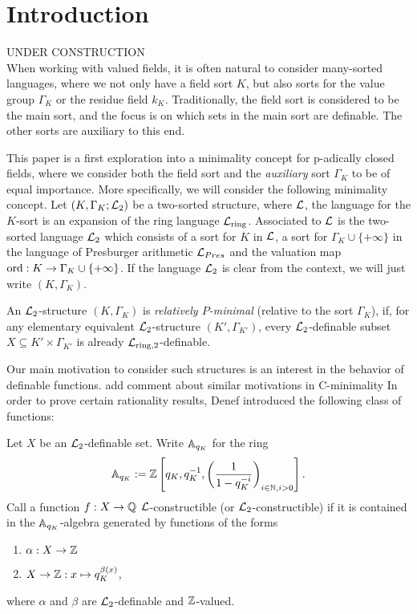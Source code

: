 \section{Introduction}
UNDER CONSTRUCTION\\
When working with valued fields, it is often natural to consider many-sorted languages, where we not only have a field sort $K$, but also sorts for the value group $\Gamma_K$ or the residue field $k_K$. Traditionally, the field sort is considered to be the main sort, and the focus is on which sets in the main sort are definable. The other sorts are auxiliary to this end.

This paper is a first exploration into a minimality concept for p-adically closed fields, where we consider both the field sort and the \emph{auxiliary} sort $\Gamma_K$ to be of equal importance. More specifically, we will consider the following minimality concept. Let $(K, \Gamma_K;\Lm_2)$ be a two-sorted structure, where $\cL$, the language for the $K$-sort is an expansion of the ring language $\Lring$. Associated to $\cL$ is the two-sorted language $\cL_2$ which consists of a sort for $K$ in $\cL$, a sort for $\Gamma_K\cup\{+\infty\}$ in the language of Presburger arithmetic $\cL_{Pres}$ and the valuation map $\ord: K\to \Gamma_K\cup\{+\infty\}$. If the language $\Lm_2$ is clear from the context, we will just write $(K, \Gamma_K)$.
\begin{defn}
An $\Lm_2$-structure $(K,\Gamma_K)$ is \emph{relatively $P$-minimal} (relative to the sort $\Gamma_K$), if, for any elementary equivalent $\Lm_2$-structure $(K',\Gamma_{K'})$, every $\Lm_2$-definable subset $X\subseteq K'\times \Gamma_{K'}$ is already $\cL_{\rm ring, 2}$-definable.
\end{defn}


 Our main motivation to consider such structures is an interest in the behavior of definable functions. {\color{red} add comment about  similar motivations in C-minimality} In order to prove certain rationality results, Denef introduced the following class of functions: 

\begin{defn}
Let $X$ be an $\cL_2$-definable set. Write $\AA_{q_K}$ for the ring \[\AA_{q_K}:=\ZZ\left[q_K, q_K^{-1}, \left(\frac1{1-q_K^{-i}}\right)_{i\in \NN, i>0}\right].\]
Call a function $f:X\to \QQ$ $\cL$-constructible (or $\cL_2$-constructible) if it is contained in the $\AA_{q_K}$-algebra generated by functions of the forms
\begin{enumerate}
\item $\alpha:X\to \ZZ$
\item $X\to \ZZ:x\mapsto q_K^{\beta(x)}$,
\end{enumerate}
where $\alpha$ and $\beta$ are $\cL_2$-definable and $\ZZ$-valued.  
\end{defn}

